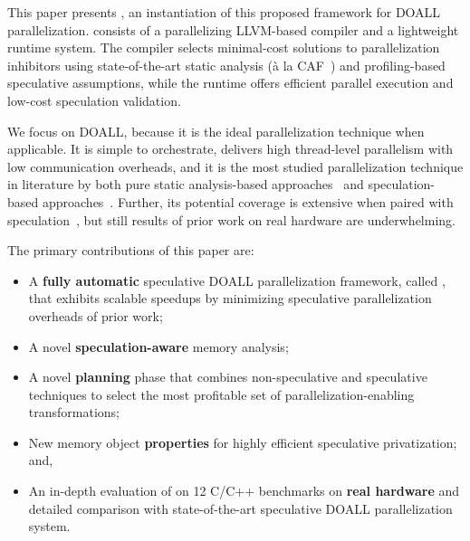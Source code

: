 This paper presents \name, an instantiation of this proposed framework for DOALL
parallelization. \name consists of a parallelizing LLVM-based compiler and a
lightweight
runtime system. The compiler selects minimal-cost solutions to parallelization
inhibitors using state-of-the-art static analysis (\`{a} la
CAF~\cite{johnson:cgo:17}) and profiling-based speculative assumptions, while
the runtime offers efficient parallel execution and low-cost speculation
validation.
%

We focus on DOALL, because it is the ideal parallelization technique when
applicable. It is simple to orchestrate, delivers high thread-level parallelism
with low communication overheads, and it is the most studied parallelization
technique in literature by both pure static analysis-based
approaches~\cite{..,.,..} and speculation-based approaches~\cite{..,..,..,..}.
Further, its potential coverage is extensive when paired with
speculation~\cite{zhong:08:hpca}, but still results of prior work on real
hardware are underwhelming.

The primary contributions of this paper are:
\begin{itemize}

\item A \textbf{fully automatic} speculative DOALL parallelization
framework, called \namensp, that  exhibits scalable speedups by
minimizing speculative parallelization overheads of prior work;

\item A novel \textbf{speculation-aware} memory analysis;

\item A novel \textbf{planning} phase that combines non-speculative
and speculative techniques to select the most profitable set of
parallelization-enabling transformations;

\item New memory object \textbf{properties} for highly efficient speculative
privatization; and,

\item An in-depth evaluation of \name on 12 C/C++ benchmarks on
\textbf{real hardware} and detailed comparison with state-of-the-art
speculative DOALL parallelization system.

\end{itemize}

